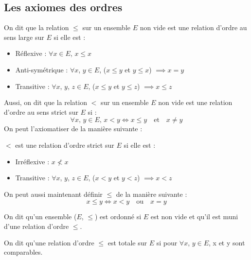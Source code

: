 \subsection{Les axiomes des ordres}


\begin{definition}

	On dit que la relation $\leqslant$ sur un ensemble $E$ non vide est une relation d'ordre au sens large sur $E$ si elle est :
	\begin{itemize}
		\item Réflexive : $\forall x \in E$, $x \leqslant x$
		\item Anti-symétrique : $\forall x$, $y \in E$, ($x \leqslant y$ et $y \leqslant x$) $\implies x = y$
		\item Transitive : $\forall x$, $y$, $z \in E$, ($x \leqslant y$ et $y \leqslant z$) $\implies x \leqslant z$
	\end{itemize}

	Aussi, on dit que la relation $<$ sur un ensemble $E$ non vide est une relation d'ordre au sens strict sur $E$ si :
	\begin{equation*}
		\forall x,\,y \in E,\,x < y \iff x \leqslant y \quad \text{et} \quad x \ne y
	\end{equation*}
	On peut l'axiomatiser de la manière suivante :

	$<$ est une relation d'ordre strict sur $E$ si elle est :
	\begin{itemize}
		\item Irréflexive : $x \nless x$
		\item Transitive : $\forall x$, $y$, $z \in E$, ($x < y$ et $y < z$) $\implies x < z$
	\end{itemize}
	On peut aussi maintenant définir $\leqslant$ de la manière suivante :
	\begin{equation*}
		x \leq y \iff  x < y \quad \text{ou} \quad  x = y
	\end{equation*}

\end{definition}


\begin{definition}

	On dit qu'un ensemble ($E$, $\leqslant$) est ordonné si $E$ est non vide et qu'il est muni d'une relation d'ordre $\leqslant$.

\end{definition}

\begin{definition}

	On dit qu'une relation d'ordre $\leqslant$ est totale sur $E$ si pour $\forall x$, $y \in E$, x et y sont comparables.

\end{definition}

